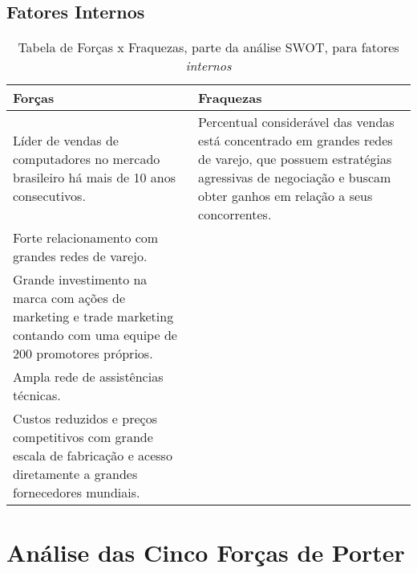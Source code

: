 {{{{\subsection {Fatores Internos}

\begin{center}
\begin{table}[H]
\begin{centering}
\begin{tabular}{>{\centering}p{}|>{\centering}p{}}
\hline
Forças & Fraquezas\tabularnewline
\hline
Líder de vendas de computadores no mercado brasileiro há mais de 10
anos consecutivos.  & Percentual considerável das vendas está concentrado em grandes redes
de varejo, que possuem estratégias agressivas de negociação e buscam
obter ganhos em relação a seus concorrentes.\tabularnewline
\hline
Forte relacionamento com grandes redes de varejo.  & \tabularnewline
\hline
Grande investimento na marca com ações de marketing e trade marketing
contando com uma equipe de 200 promotores próprios.  & \tabularnewline
\hline
Ampla rede de assistências técnicas.  & \tabularnewline
\hline
Custos reduzidos e preços competitivos com grande escala de fabricação
e acesso diretamente a grandes fornecedores mundiais.  & \tabularnewline
\hline
\end{tabular}
\par\end{centering}
\caption{Tabela de Forças x Fraquezas, parte da análise SWOT, para fatores
\emph{internos}}
\end{table}
\par\end{center}

\section{Análise das Cinco Forças de Porter}

}}}}
